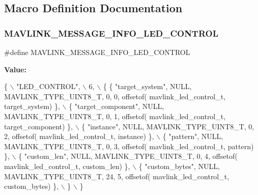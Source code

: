 \subsection{Macro Definition Documentation}
\mbox{\label{mavlink__msg__led__control_8h_a40036b3d42a2cba219810f8bab427a38}} 
\subsubsection{M\+A\+V\+L\+I\+N\+K\+\_\+\+M\+E\+S\+S\+A\+G\+E\+\_\+\+I\+N\+F\+O\+\_\+\+L\+E\+D\+\_\+\+C\+O\+N\+T\+R\+OL}
{\footnotesize\ttfamily \#define M\+A\+V\+L\+I\+N\+K\+\_\+\+M\+E\+S\+S\+A\+G\+E\+\_\+\+I\+N\+F\+O\+\_\+\+L\+E\+D\+\_\+\+C\+O\+N\+T\+R\+OL}

{\bfseries Value\+:}
\begin{DoxyCode}
\{ \(\backslash\)
    \textcolor{stringliteral}{"LED\_CONTROL"}, \(\backslash\)
    6, \(\backslash\)
    \{  \{ \textcolor{stringliteral}{"target\_system"}, NULL, MAVLINK_TYPE_UINT8_T, 0, 0, offsetof(
      mavlink_led_control_t, target\_system) \}, \(\backslash\)
         \{ \textcolor{stringliteral}{"target\_component"}, NULL, MAVLINK_TYPE_UINT8_T, 0, 1, offsetof(
      mavlink_led_control_t, target\_component) \}, \(\backslash\)
         \{ \textcolor{stringliteral}{"instance"}, NULL, MAVLINK_TYPE_UINT8_T, 0, 2, offsetof(
      mavlink_led_control_t, instance) \}, \(\backslash\)
         \{ \textcolor{stringliteral}{"pattern"}, NULL, MAVLINK_TYPE_UINT8_T, 0, 3, offsetof(
      mavlink_led_control_t, pattern) \}, \(\backslash\)
         \{ \textcolor{stringliteral}{"custom\_len"}, NULL, MAVLINK_TYPE_UINT8_T, 0, 4, offsetof(
      mavlink_led_control_t, custom\_len) \}, \(\backslash\)
         \{ \textcolor{stringliteral}{"custom\_bytes"}, NULL, MAVLINK_TYPE_UINT8_T, 24, 5, offsetof(
      mavlink_led_control_t, custom\_bytes) \}, \(\backslash\)
         \} \(\backslash\)
\}
\end{DoxyCode}
\mbox{\label{mavlink__msg__led__control_8h_a74f2739b8618b7c31ca937c0c9e2a799}} 
